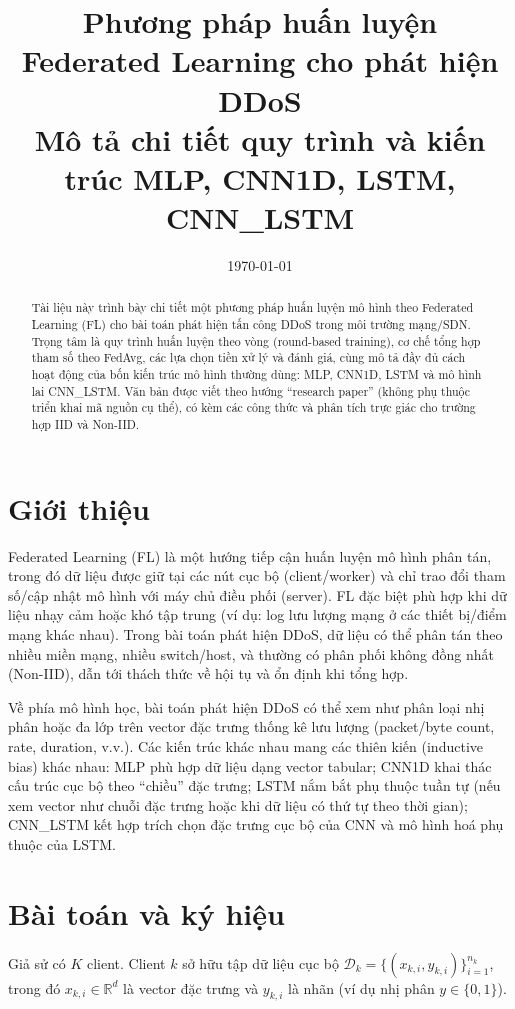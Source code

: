 \documentclass[12pt,a4paper]{article}
\title{Phương pháp huấn luyện Federated Learning cho phát hiện DDoS\\Mô tả chi tiết quy trình và kiến trúc MLP, CNN1D, LSTM, CNN\_LSTM}
\author{}
\date{\today}
\begin{document}
\maketitle

\begin{abstract}
Tài liệu này trình bày chi tiết một phương pháp huấn luyện mô hình theo Federated Learning (FL) cho bài toán phát hiện tấn công DDoS trong môi trường mạng/SDN. Trọng tâm là quy trình huấn luyện theo vòng (round-based training), cơ chế tổng hợp tham số theo FedAvg, các lựa chọn tiền xử lý và đánh giá, cùng mô tả đầy đủ cách hoạt động của bốn kiến trúc mô hình thường dùng: MLP, CNN1D, LSTM và mô hình lai CNN\_LSTM. Văn bản được viết theo hướng ``research paper'' (không phụ thuộc triển khai mã nguồn cụ thể), có kèm các công thức và phân tích trực giác cho trường hợp IID và Non-IID.
\end{abstract}

\section{Giới thiệu}

Federated Learning (FL) là một hướng tiếp cận huấn luyện mô hình phân tán, trong đó dữ liệu được giữ tại các nút cục bộ (client/worker) và chỉ trao đổi tham số/cập nhật mô hình với máy chủ điều phối (server). FL đặc biệt phù hợp khi dữ liệu nhạy cảm hoặc khó tập trung (ví dụ: log lưu lượng mạng ở các thiết bị/điểm mạng khác nhau). Trong bài toán phát hiện DDoS, dữ liệu có thể phân tán theo nhiều miền mạng, nhiều switch/host, và thường có phân phối không đồng nhất (Non-IID), dẫn tới thách thức về hội tụ và ổn định khi tổng hợp.

Về phía mô hình học, bài toán phát hiện DDoS có thể xem như phân loại nhị phân hoặc đa lớp trên vector đặc trưng thống kê lưu lượng (packet/byte count, rate, duration, v.v.). Các kiến trúc khác nhau mang các thiên kiến (inductive bias) khác nhau: MLP phù hợp dữ liệu dạng vector tabular; CNN1D khai thác cấu trúc cục bộ theo ``chiều'' đặc trưng; LSTM nắm bắt phụ thuộc tuần tự (nếu xem vector như chuỗi đặc trưng hoặc khi dữ liệu có thứ tự theo thời gian); CNN\_LSTM kết hợp trích chọn đặc trưng cục bộ của CNN và mô hình hoá phụ thuộc của LSTM.

\section{Bài toán và ký hiệu}

Giả sử có $K$ client. Client $k$ sở hữu tập dữ liệu cục bộ $\mathcal{D}_k = \{(x_{k,i}, y_{k,i})\}_{i=1}^{n_k}$, trong đó $x_{k,i}\in\mathbb{R}^d$ là vector đặc trưng và $y_{k,i}$ là nhãn (ví dụ nhị phân $y\in\{0,1\}$).
\end{document}
